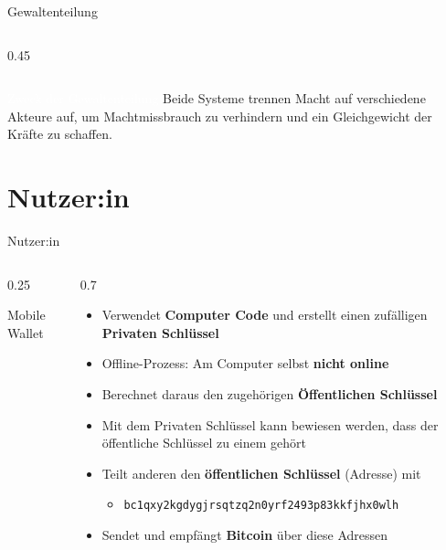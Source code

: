 \documentclass[aspectratio=169,t,11pt]{beamer}
\begin{document}
\begin{frame}{Gewaltenteilung}
\begin{columns}[T]
\begin{column}{0.45\textwidth}
		\end{column}
	\end{columns}

	\vspace{1em}
	\begin{alertblock}{\textcolor{white}{Zweck der Gewaltenteilung}}
		\small
		Beide Systeme trennen Macht auf verschiedene Akteure auf, um Machtmissbrauch zu verhindern und ein Gleichgewicht der Kräfte zu schaffen.
	\end{alertblock}
\end{frame}

\section{Nutzer:in}

\begin{frame}{Nutzer:in}
	\begin{columns}[T]
		\begin{column}{0.25\textwidth}
			\centering
			\vspace{0.3cm}

			{\small Mobile Wallet}
		\end{column}

		\begin{column}{0.7\textwidth}
			\begin{itemize}
				\item Verwendet \textbf{Computer Code} und erstellt einen zufälligen \textbf{Privaten Schlüssel}
				\item Offline-Prozess: Am Computer selbst \textbf{nicht online}
				\item Berechnet daraus den zugehörigen \textbf{Öffentlichen Schlüssel}
				\item Mit dem Privaten Schlüssel kann bewiesen werden, dass der öffentliche Schlüssel zu einem gehört
				\item Teilt anderen den \textbf{öffentlichen Schlüssel} (Adresse) mit
				      \begin{itemize}
					      \item[\tiny\textcolor{gray}{z.B.}] \scriptsize\texttt{bc1qxy2kgdygjrsqtzq2n0yrf2493p83kkfjhx0wlh}
				      \end{itemize}
				\item Sendet und empfängt \textbf{Bitcoin} über diese Adressen
			\end{itemize}
		\end{column}
	\end{columns}
\end{frame}
\end{document}

